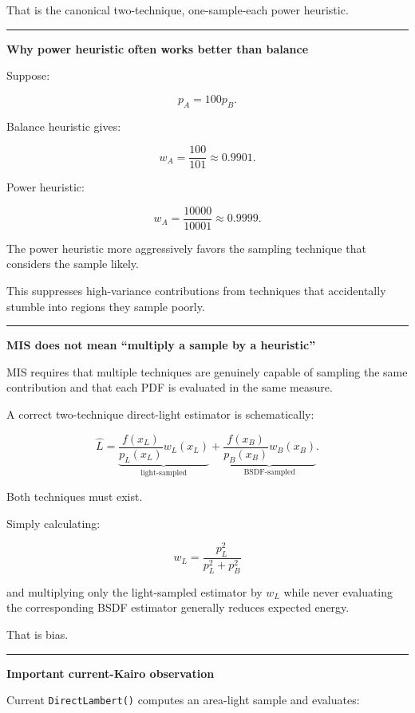 That is the canonical two-technique, one-sample-each power heuristic.

\begin{center}\rule{0.5\linewidth}{0.5pt}\end{center}

\textbf{Why power heuristic often works better than balance}

Suppose:

\[
p_A=100p_B.
\]

Balance heuristic gives:

\[
w_A
=
\frac{100}{101}
\approx0.9901.
\]

Power heuristic:

\[
w_A
=
\frac{10000}{10001}
\approx0.9999.
\]

The power heuristic more aggressively favors the sampling technique that considers the sample likely.

This suppresses high-variance contributions from techniques that accidentally stumble into regions they sample poorly.

\begin{center}\rule{0.5\linewidth}{0.5pt}\end{center}

\textbf{MIS does not mean ``multiply a sample by a heuristic''}

MIS requires that multiple techniques are genuinely capable of sampling the same contribution and that each PDF is evaluated in the same measure.

A correct two-technique direct-light estimator is schematically:

\[
\hat L=
\underbrace{
\frac{
f(x_L)
}{
p_L(x_L)
}
w_L(x_L)
}_{\text{light-sampled}}
+
\underbrace{
\frac{
f(x_B)
}{
p_B(x_B)
}
w_B(x_B)
}_{\text{BSDF-sampled}}.
\]

Both techniques must exist.

Simply calculating:

\[
w_L
=
\frac{p_L^2}{p_L^2+p_B^2}
\]

and multiplying only the light-sampled estimator by \(w_L\) while never evaluating the corresponding BSDF estimator generally reduces expected energy.

That is bias.

\begin{center}\rule{0.5\linewidth}{0.5pt}\end{center}

\textbf{Important current-Kairo observation}

Current \texttt{DirectLambert()} computes an area-light sample and evaluates:

